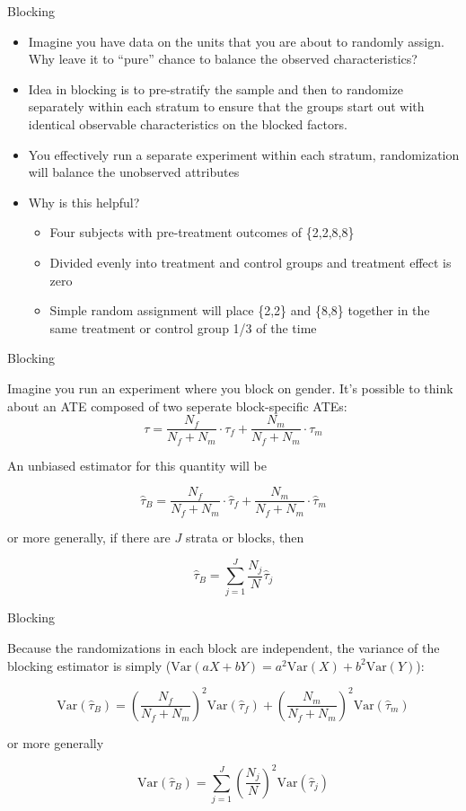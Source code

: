 \documentclass{beamer}
\numberwithin{equation}{section}
\begin{document}
\begin{frame}{Blocking}
\begin{itemize}
\itemsep1pt\parskip0pt
\item
  Imagine you have data on the units that you are about to randomly
  assign. Why leave it to ``pure'' chance to balance the observed
  characteristics?
\item
  Idea in blocking is to pre-stratify the sample and then to randomize
  separately within each stratum to ensure that the groups start out
  with identical observable characteristics on the blocked factors.
\item
  You effectively run a separate experiment within each stratum,
  randomization will balance the unobserved attributes
\item
  Why is this helpful?

  \begin{itemize}
  \itemsep1pt\parskip0pt
  \item
    Four subjects with pre-treatment outcomes of \{2,2,8,8\}
  \item
    Divided evenly into treatment and control groups and treatment
    effect is zero
  \item
    Simple random assignment will place \{2,2\} and \{8,8\} together in
    the same treatment or control group 1/3 of the time
  \end{itemize}
\end{itemize}

\end{frame}

\begin{frame}{Blocking}

Imagine you run an experiment where you block on gender. It's possible
to think about an ATE composed of two seperate block-specific ATEs:
\[ \tau = \frac{N_f}{N_f + N_m} \cdot \tau_f  + \frac{N_m}{N_f + N_m} \cdot \tau_m\]
\pause

An unbiased estimator for this quantity will be

\[ \hat \tau_{B} = \frac{N_f}{N_f + N_m} \cdot \hat \tau_f  + \frac{N_m}{N_f + N_m} \cdot \hat \tau_m\]
\pause

or more generally, if there are $J$ strata or blocks, then

\[\hat\tau_B = \sum_{j=1}^J \frac{N_j}{N} \hat\tau_j\]

\end{frame}

\begin{frame}{Blocking}

Because the randomizations in each block are independent, the variance
of the blocking estimator is simply
($\text{Var}(aX + bY) = a^2\text{Var}(X) + b^2\text{Var}(Y)$):

\[\text{Var}(\hat \tau_B) = \left (\frac{N_f}{N_f + N_m} \right)^2 \text{Var}(\hat \tau_f) + \left(\frac{N_m}{N_f + N_m} \right)^2 \text{Var}(\hat \tau_m)\]

or more generally

\[ \text{Var}(\hat \tau_B)  =  \sum_{j=1}^J  \left (\frac{N_j}{N} \right)^2  \text{Var}(\hat \tau_j)\]

\end{frame}
\end{document}
